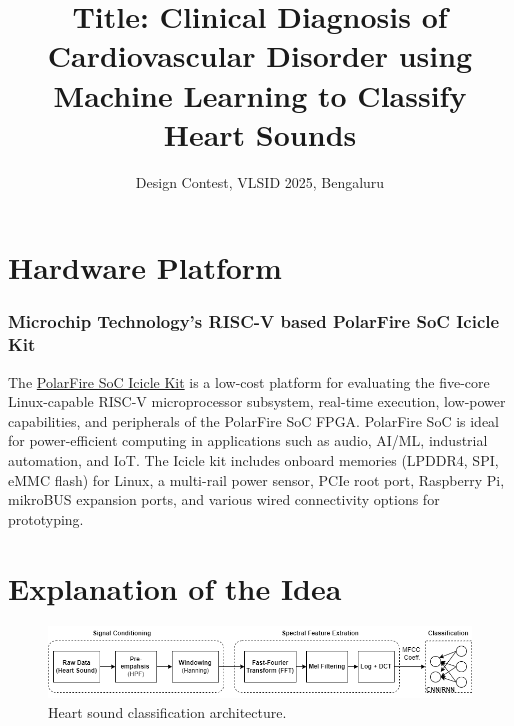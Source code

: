 \documentclass[12pt]{article}
\title{Title: Clinical Diagnosis of Cardiovascular Disorder using Machine Learning to Classify Heart Sounds }
\author{Design Contest, VLSID 2025, Bengaluru}
\begin{document}
\maketitle

\begin{abstract}

\end{abstract}

\section{Hardware Platform}

\subsubsection*{Microchip Technology’s RISC-V based PolarFire SoC Icicle Kit}

The \href{https://www.microchip.com/en-us/development-tool/mpfs-icicle-kit-es}{PolarFire SoC Icicle Kit} is a low-cost platform for evaluating the five-core Linux-capable RISC-V microprocessor subsystem, real-time execution, low-power capabilities, and peripherals of the PolarFire SoC FPGA. PolarFire SoC is ideal for power-efficient computing in applications such as audio, AI/ML, industrial automation, and IoT. The Icicle kit includes onboard memories (LPDDR4, SPI, eMMC flash) for Linux, a multi-rail power sensor, PCIe root port, Raspberry Pi, mikroBUS expansion ports, and various wired connectivity options for prototyping.


\section{Explanation of the Idea}

\begin{figure}[htbp]	
    \includegraphics[width=1.0\textwidth]{figs/HSC-arch.png}
    \caption{Heart sound classification architecture.}
    \label{fig:arch-heart-sound}
\end{figure}
\end{document}
